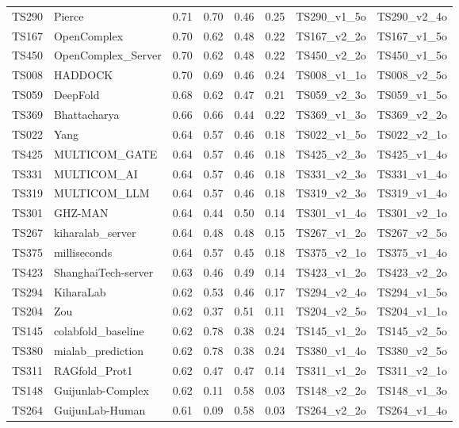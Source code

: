 \begin{table}[ht]
{\begin{tabular}{llllllll}
TS290 & Pierce & 0.71 & 0.70 & 0.46 & 0.25 & TS290\_v1\_5o & TS290\_v2\_4o \\ 
TS167 & OpenComplex & 0.70 & 0.62 & 0.48 & 0.22 & TS167\_v2\_2o & TS167\_v1\_5o \\ 
TS450 & OpenComplex\_Server & 0.70 & 0.62 & 0.48 & 0.22 & TS450\_v2\_2o & TS450\_v1\_5o \\ 
TS008 & HADDOCK & 0.70 & 0.69 & 0.46 & 0.24 & TS008\_v1\_1o & TS008\_v2\_5o \\ 
TS059 & DeepFold & 0.68 & 0.62 & 0.47 & 0.21 & TS059\_v2\_3o & TS059\_v1\_5o \\ 
TS369 & Bhattacharya & 0.66 & 0.66 & 0.44 & 0.22 & TS369\_v1\_3o & TS369\_v2\_2o \\ 
TS022 & Yang & 0.64 & 0.57 & 0.46 & 0.18 & TS022\_v1\_5o & TS022\_v2\_1o \\ 
TS425 & MULTICOM\_GATE & 0.64 & 0.57 & 0.46 & 0.18 & TS425\_v2\_3o & TS425\_v1\_4o \\ 
TS331 & MULTICOM\_AI & 0.64 & 0.57 & 0.46 & 0.18 & TS331\_v2\_3o & TS331\_v1\_4o \\ 
TS319 & MULTICOM\_LLM & 0.64 & 0.57 & 0.46 & 0.18 & TS319\_v2\_3o & TS319\_v1\_4o \\ 
TS301 & GHZ-MAN & 0.64 & 0.44 & 0.50 & 0.14 & TS301\_v1\_4o & TS301\_v2\_1o \\ 
TS267 & kiharalab\_server & 0.64 & 0.48 & 0.48 & 0.15 & TS267\_v1\_2o & TS267\_v2\_5o \\ 
TS375 & milliseconds & 0.64 & 0.57 & 0.45 & 0.18 & TS375\_v2\_1o & TS375\_v1\_4o \\ 
TS423 & ShanghaiTech-server & 0.63 & 0.46 & 0.49 & 0.14 & TS423\_v1\_2o & TS423\_v2\_2o \\ 
TS294 & KiharaLab & 0.62 & 0.53 & 0.46 & 0.17 & TS294\_v2\_4o & TS294\_v1\_5o \\ 
TS204 & Zou & 0.62 & 0.37 & 0.51 & 0.11 & TS204\_v2\_5o & TS204\_v1\_1o \\ 
TS145 & colabfold\_baseline & 0.62 & 0.78 & 0.38 & 0.24 & TS145\_v1\_2o & TS145\_v2\_5o \\ 
TS380 & mialab\_prediction & 0.62 & 0.78 & 0.38 & 0.24 & TS380\_v1\_4o & TS380\_v2\_5o \\ 
TS311 & RAGfold\_Prot1 & 0.62 & 0.47 & 0.47 & 0.14 & TS311\_v1\_2o & TS311\_v2\_1o \\ 
TS148 & Guijunlab-Complex & 0.62 & 0.11 & 0.58 & 0.03 & TS148\_v2\_2o & TS148\_v1\_3o \\ 
TS264 & GuijunLab-Human & 0.61 & 0.09 & 0.58 & 0.03 & TS264\_v2\_2o & TS264\_v1\_4o \\ 

\end{tabular}}
\end{table}
